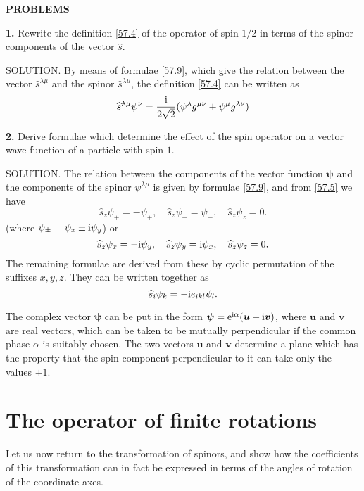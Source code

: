 {\small
	
\textbf{PROBLEMS}


\textbf{1.} Rewrite the definition \eqref{57.4} of the operator of spin $ 1/2 $ in terms of the spinor components of the vector $\hat{s}$.





SOLUTION. By means of formulae \eqref{57.9}, which give the relation between the vector $\hat{s}^{\lambda\mu}$ and the spinor $\hat{s}^{\lambda\mu}$, the definition \eqref{57.4} can be written as
\[ \widehat{s}^{\lambda\mu}\psi^\nu=\frac{\mathrm{i}}{2\sqrt{2}}(\psi^\lambda g^{\mu\nu}+\psi^\mu g^{\lambda\nu}) \]




\textbf{2.} Derive formulae which determine the effect of the spin operator on a vector wave function of a particle with spin $ 1 $.





SOLUTION. The relation between the components of the vector function $ \bm{\psi} $ and the components of the spinor $\psi^{\lambda\mu}$ is given by formulae \eqref{57.9}, and from \eqref{57.5} we have
\[ \hat{s}_z\psi_+=-\psi_+,\quad\hat{s}_z\psi_-=\psi_-,\quad\hat{s}_z\psi_z=0. \]
(where $ \psi_\pm=\psi_x\pm\mathrm{i}\psi_y $) or
\[ \widehat{s}_z\psi_x=-\mathrm{i}\psi_y,\quad\widehat{s}_z\psi_y=\mathrm{i}\psi_x,\quad\widehat{s}_z\psi_z=0.  \] 
The remaining formulae are derived from these by cyclic permutation of the suffixes $ x, y, z $. They can be written together as
\[ \widehat{s}_i\psi_k=-\mathrm{i} e_{ikl}\psi_l. \]



The complex vector $ \bm{\psi} $ can be put in the form $ \bm{\psi}= \mathrm{e}^{\mathrm{i}\alpha}(\bm{u} + \mathrm{i}\bm{v}) $, where $ \bm{u} $ and $ \bm{v} $ are real vectors, which can be taken to be mutually perpendicular if the common phase $ \alpha $ is suitably chosen. The two vectors $ \bm{u} $ and $ \bm{v} $ determine a plane which has the property that the spin component perpendicular to it can take only the values $ \pm1 $.}



\section{The operator of finite rotations}\label{The operator of finite rotations}
Let us now return to the transformation of spinors, and show how the coefficients of this transformation can in fact be expressed in terms of the angles of rotation of the coordinate axes.

